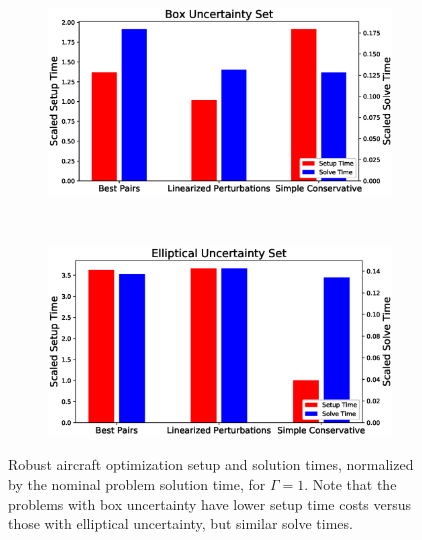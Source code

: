 \begin{figure}[h!]
    \centering
    \captionsetup{justification=centering, font=small}
    \begin{subfigure}{0.49\textwidth}
        \centering
        \includegraphics[width=\linewidth]{box_sst.eps}
    \end{subfigure}
    ~
    \begin{subfigure}{0.49\textwidth}
        \centering
        \includegraphics[width=\linewidth]{ell_sst.eps}
    \end{subfigure}
    \caption{Robust aircraft optimization setup and solution times, normalized by the
    nominal problem solution time, for $\Gamma = 1$.
    Note that the problems with box uncertainty have lower setup
    time costs versus those with elliptical uncertainty, but similar solve times.}
    \label{compare_signomial}
\end{figure}

